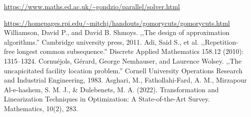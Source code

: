 \documentclass[a4paper, utf8, 11pt, colorlinks]{book}
\theoremstyle{definition}
\begin{document}
\begin{thebibliography}{widest entry}
      \url{https://www.maths.ed.ac.uk/~gondzio/parallel/solver.html}
   
     \url{https://homepages.rpi.edu/~mitchj/handouts/gomorycuts/gomorycuts.html}
     Williamson, David P., and David B. Shmoys. ,,The design of approximation algorithms.'' Cambridge university press, 2011.
     Adi, Said S., et al. ,,Repetition-free longest common subsequence.'' Discrete Applied Mathematics 158.12 (2010): 1315--1324.
       Cornuéjols, Gérard, George Nemhauser, and Laurence Wolsey. ,,The uncapicitated facility location problem.'' Cornell University Operations Research and Industrial Engineering, 1983.
     Asghari, M., Fathollahi-Fard, A. M., Mirzapour Al-e-hashem, S. M. J., \& Dulebenets, M. A. (2022). Transformation and Linearization Techniques in Optimization: A State-of-the-Art Survey. Mathematics, 10(2), 283.
\end{thebibliography}
\end{document}
